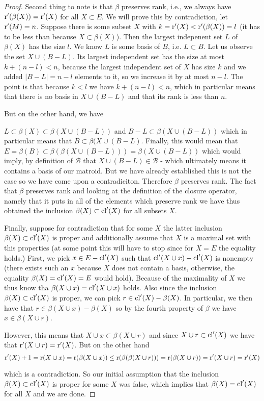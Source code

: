 \begin{proof}
Second thing to note is that $\beta$ preserves rank, i.e., we always have $\text{r}'(\beta(X)) = \text{r}'(X)$ for all $X\subset E$. We will prove this by contradiction, let $\text{r}'(M) = n$. Suppose there is some subset $X$ with $k  = \text{r}'(X)<\text{r}'(\beta(X)) = l$ (it has to be less than because $X \subset \beta(X)$). Then the largest indepenent set $L$ of $\beta(X)$ has the size $l$. We know $L$ is some basis of $B$, i.e. $L \subset B$. Let us observe the set $X \cup (B-L)$.  Its largest independent set has the size at most $k + (n-l)<n$, because the largest independent set of $X$ has size $k$ and we added $|B-L| = n - l$ elements to it, so we increase it by at most $n-l$. The point is that because $k<l$ we have $k + (n-l)<n$, which in particular means that there is no basis in $X \cup (B-L)$ and that its rank is less than $n.$


But on the other hand, we have

$L \subset \beta(X) \subset \beta(X \cup (B-L))$ and $B-L \subset \beta(X \cup (B-L))$ which in particular means that $B \subset \beta(X \cup (B-L)$. Finally, this would mean that  
$E = \beta(B)\subset \beta(\beta(X \cup (B-L))) = \beta(X \cup (B-L))$ which would imply, by definition of $\mathcal{B}$ that $X \cup (B-L)
\in \mathcal{B}$ - which ultimately means it contains a basis of our matroid. But we have already established this is not the case so we have come upon a contradiciton. Therefore $\beta$ preserves rank.
The fact that $\beta$ preserves rank and looking at the definition of the closure operator, namely that it puts in all of the elements which preserve rank we have thus obtained the inclusion $\beta(X) \subset \mathrm{cl}'(X)$ for all subsets $X.$

Finally, suppose for contradiction that for some $X$ the latter inclusion $\beta(X) \subset \mathrm{cl}'(X)$ is proper and additionally assume that $X$ is a maximal set with this properties (at some point this will have to stop since for $X =E$ the equality holds.) First, we pick $x \in E - \mathrm{cl}'(X)$ such that $\mathrm{cl}'(X\cup x) - \mathrm{cl}'(X)$ is nonempty (there exists such an $x$ because $X$ does not contain a basis, otherwise, the equality $\beta(X) = \mathrm{cl}'(X) = E$ would hold).
Because of the maximality of $X$ we thus know tha $\beta(X\cup x) = \mathrm{cl}'(X \cup x)$ holds. Also since the inclusion $\beta(X) \subset \mathrm{cl}'(X)$ is proper, we can pick $r \in \mathrm{cl}'(X) - \beta(X)$. In particular, we then have that $r \in \beta(X\cup x) - \beta(X)$ so by the fourth property of $\beta$ we have $x \in \beta(X\cup r)$.

However, this means that $X \cup x \subset \beta(X\cup r)$ and since $X\cup r \subset \mathrm{cl}'(X)$ we have that $\text{r}'(X\cup r) = 
\text{r}'(X)$. But on the other hand $$\text{r}'(X) + 1= \text{r}(X\cup x) = \text{r}(\beta(X\cup x))\leq \text{r}(\beta(\beta(X\cup r))) = \text{r}(\beta(X\cup r)) = \text{r}'(X\cup r) = \text{r}'(X)$$

which is a contradiction. So our initial assumption that the inclusion $\beta(X) \subset \mathrm{cl}'(X)$ is proper for some $X$ was false, which implies that $\beta(X) = \mathrm{cl}'(X)$ for all $X$ and we are done.




\end{proof}




